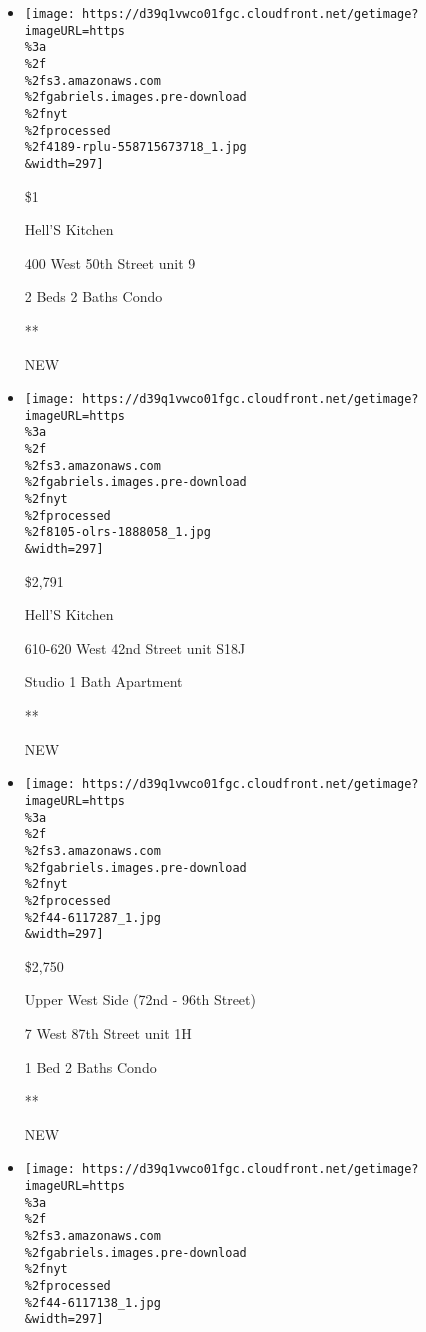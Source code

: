 \begin{itemize}
\item
  \href{/real-estate/usa/ny/new-york/hells-kitchen/homes-for-rent/400-west-50th-street/4189-RPLU-558715673718?}{}

  \texttt{[image: https://d39q1vwco01fgc.cloudfront.net/getimage?imageURL=https\\\%3a\\\%2f\\\%2fs3.amazonaws.com\\\%2fgabriels.images.pre-download\\\%2fnyt\\\%2fprocessed\\\%2f4189-rplu-558715673718\_1.jpg\\\&width=297]}

  \$1

  Hell'S Kitchen

  400 West 50th Street unit 9

  2 Beds \textbar{} 2 Baths \textbar{} Condo

  **

  NEW
\item
  \href{/real-estate/usa/ny/new-york/hells-kitchen/homes-for-rent/610-620-west-42nd-street/8105-OLRS-1888058?}{}

  \texttt{[image: https://d39q1vwco01fgc.cloudfront.net/getimage?imageURL=https\\\%3a\\\%2f\\\%2fs3.amazonaws.com\\\%2fgabriels.images.pre-download\\\%2fnyt\\\%2fprocessed\\\%2f8105-olrs-1888058\_1.jpg\\\&width=297]}

  \$2,791

  Hell'S Kitchen

  610-620 West 42nd Street unit S18J

  Studio \textbar{} 1 Bath \textbar{} Apartment

  **

  NEW
\item
  \href{/real-estate/usa/ny/new-york/upper-west-side-72nd---96th-street/homes-for-rent/7-west-87th-street/44-6117287?}{}

  \texttt{[image: https://d39q1vwco01fgc.cloudfront.net/getimage?imageURL=https\\\%3a\\\%2f\\\%2fs3.amazonaws.com\\\%2fgabriels.images.pre-download\\\%2fnyt\\\%2fprocessed\\\%2f44-6117287\_1.jpg\\\&width=297]}

  \$2,750

  Upper West Side (72nd - 96th Street)

  7 West 87th Street unit 1H

  1 Bed \textbar{} 2 Baths \textbar{} Condo

  **

  NEW
\item
  \href{/real-estate/usa/ny/new-york/lincoln-square/homes-for-rent/46-west-65th-street/44-6117138?}{}

  \texttt{[image: https://d39q1vwco01fgc.cloudfront.net/getimage?imageURL=https\\\%3a\\\%2f\\\%2fs3.amazonaws.com\\\%2fgabriels.images.pre-download\\\%2fnyt\\\%2fprocessed\\\%2f44-6117138\_1.jpg\\\&width=297]}


\end{itemize}
